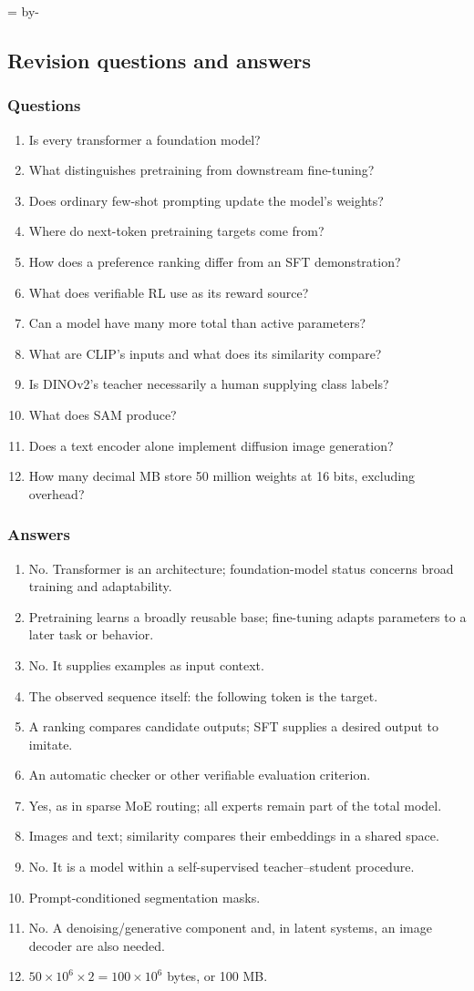 \documentclass[11pt]{article}
\newcommand{\newsubsection}[1]{\par\begingroup\skip0=\pagegoal\advance\skip0 by-\pagetotal\ifdim\skip0<12\baselineskip\newpage\fi\endgroup\subsection{#1}}
\begin{document}
\newsubsection{Revision questions and answers}
\subsubsection{Questions}
\begin{enumerate}
\item Is every transformer a foundation model?
\item What distinguishes pretraining from downstream fine-tuning?
\item Does ordinary few-shot prompting update the model's weights?
\item Where do next-token pretraining targets come from?
\item How does a preference ranking differ from an SFT demonstration?
\item What does verifiable RL use as its reward source?
\item Can a model have many more total than active parameters?
\item What are CLIP's inputs and what does its similarity compare?
\item Is DINOv2's teacher necessarily a human supplying class labels?
\item What does SAM produce?
\item Does a text encoder alone implement diffusion image generation?
\item How many decimal MB store 50 million weights at 16 bits, excluding overhead?
\end{enumerate}
\subsubsection{Answers}
\begin{enumerate}
\item No. Transformer is an architecture; foundation-model status concerns broad training and adaptability.
\item Pretraining learns a broadly reusable base; fine-tuning adapts parameters to a later task or behavior.
\item No. It supplies examples as input context.
\item The observed sequence itself: the following token is the target.
\item A ranking compares candidate outputs; SFT supplies a desired output to imitate.
\item An automatic checker or other verifiable evaluation criterion.
\item Yes, as in sparse MoE routing; all experts remain part of the total model.
\item Images and text; similarity compares their embeddings in a shared space.
\item No. It is a model within a self-supervised teacher--student procedure.
\item Prompt-conditioned segmentation masks.
\item No. A denoising/generative component and, in latent systems, an image decoder are also needed.
\item $50\times10^6\times2=100\times10^6$ bytes, or 100 MB.
\end{enumerate}
\end{document}
